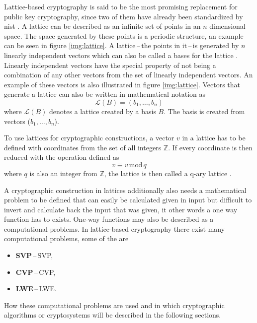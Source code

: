 Lattice-based cryptography is said to be the most promising replacement for public key cryptography, since two of them have already been standardized by nist \cite{Alagic2022}. A lattice can be described as an infinite set of points in an $n$ dimensional space. The space generated by these points is a periodic structure, an example can be seen in figure \ref{img:lattice}. A lattice\,--\,the points in it\,--\,is generated by $n$ linearly independent vectors which can also be called a bases for the lattice \cite{Ajati1996}. Linearly independent vectors have the special property of not being a combination of any other vectors from the set of linearly independent vectors. An example of these vectors is also illustrated in figure \ref{img:lattice}. Vectors that generate a lattice can also be written in mathematical notation as
\begin{equation}
  \mathcal{L}(B)=(b_1,\dots,b_n)
\end{equation}
where $\mathcal{L}(B)$ denotes a lattice created by a basis $B$. The basis is created from vectors ($b_1,\dots,b_n$).


To use lattices for cryptographic constructions, a vector $v$ in a lattice has to be defined with coordinates from the set of all integers $\mathbb{Z}$. If every coordinate is then reduced with the operation defined as
\begin{equation}
  v\equiv v\,\mathrm{mod}\,q
\end{equation}
where $q$ is also an integer from $\mathbb{Z}$, the lattice is then called a q-ary lattice \cite{Bernstein2009}.

A cryptographic construction in lattices additionally also needs a mathematical problem to be defined that can easily be calculated given in input but difficult to invert and calculate back the input that was given, it other words a one way function has to exists. One-way functions may also be described as a computational problems. In lattice-based cryptography there exist many computational problems, some of the are
\begin{itemize}
  \item \textbf{SVP}\,--\,\acl{SVP},
  \item \textbf{CVP}\,--\,\acl{CVP},
  \item \textbf{LWE}\,--\,\acl{LWE}\cite{Bernstein2009}.
\end{itemize}
How these computational problems are used and in which cryptographic algorithms or cryptosystems will be described in the following sections.


